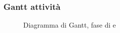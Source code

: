 \subsubsection{Gantt attività}
\begin{figure}[H]
	\centering
	\caption{Diagramma di Gantt, fase di \PD e \Cod}
\end{figure}

